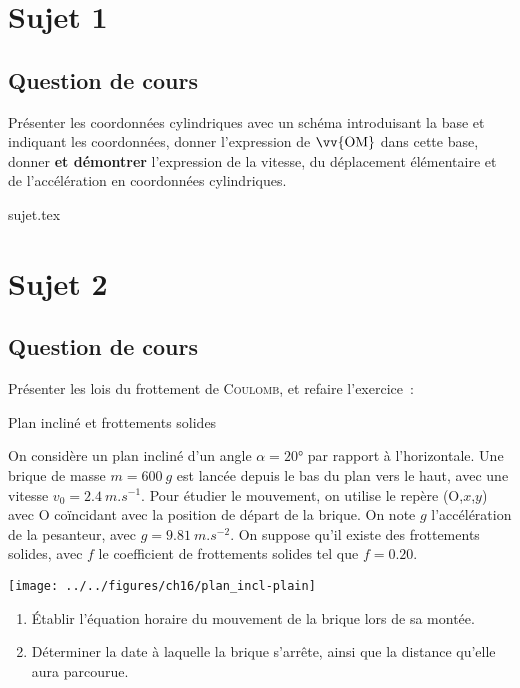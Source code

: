 \documentclass[a4paper, 11pt]{book}
\begin{document}
\chapter{Sujet 1}
\section{Question de cours}

Présenter les coordonnées cylindriques avec un schéma introduisant la base et
indiquant les coordonnées, donner l'expression de $\vv{\rm OM}$ dans cette base, donner
\textbf{et démontrer} l'expression de la vitesse, du déplacement élémentaire et
de l'accélération en coordonnées cylindriques.

\resetQ
{sujet.tex}

\chapter{Sujet 2}
\section{Question de cours}

Présenter les lois du frottement de \textsc{Coulomb}, et refaire
l'exercice~:
\begin{NCexem}[width=\linewidth]{Plan incliné et frottements solides}
    \begin{minipage}{0.6\linewidth}
        On considère un plan incliné d'un angle $\alpha = \ang{20;;}$ par
        rapport à l'horizontale. Une brique de masse $m = \SI{600}{g}$ est
        lancée depuis le bas du plan vers le haut, avec une vitesse $v_0 =
        \SI{2.4}{m.s^{-1}}$. Pour étudier le mouvement, on utilise le repère
        (O,$x$,$y$) avec O coïncidant avec la position de départ de la brique.
        On note $g$ l'accélération de la pesanteur, avec $g =
        \SI{9.81}{m.s^{-2}}$. On suppose qu'il existe des frottements solides,
        avec $f$ le coefficient de frottements solides tel que $f =
        \num{0.20}$.\bigbreak
    \end{minipage}
    \hfill
    \begin{minipage}{0.35\linewidth}
        \begin{center}
            \texttt{[image: ../../figures/ch16/plan\_incl-plain]}
        \end{center}
    \end{minipage}
    \begin{enumerate}
        \item Établir l'équation horaire du mouvement de la brique lors de
            sa montée.
        \item Déterminer la date à laquelle la brique s'arrête, ainsi que la
            distance qu'elle aura parcourue.
    \end{enumerate}
\end{NCexem}
\end{document}
